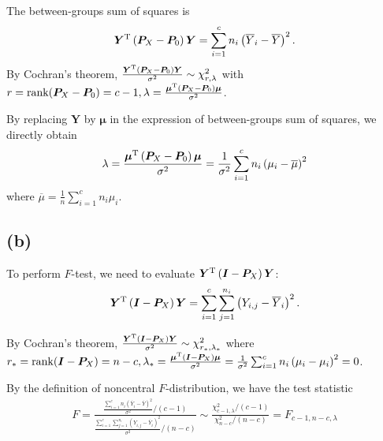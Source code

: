 \documentclass[a4paper]{article}
\begin{document}
The between-groups sum of squares is
\begin{align*}
\bm{Y}^{\rm T}\left(\bm{P}_{X} -\bm{P}_{0} \right)\bm{Y} = \sum_{i=1}^{c} n_{i}\left(\overline{Y}_{i} - \overline{Y}\right)^2.
\end{align*}
By Cochran's theorem, $\frac{\bm{Y}^{\rm T}\left(\bm{P}_{X} -\bm{P}_{0} \right)\bm{Y}}{\sigma^2} \sim \chi_{r, \lambda}^2$ with $r = \mathrm{rank}(\bm{P}_{X} -\bm{P}_{0}) = c-1, \lambda = \frac{\bm{\mu}^{\rm T}\left(\bm{P}_{X} -\bm{P}_{0} \right)\bm{\mu}}{\sigma^2}$.

By replacing $\bm{Y}$ by $\bm{\mu}$ in the expression of between-groups sum of squares, we directly obtain
\begin{align*}
\lambda = \frac{\bm{\mu}^{\rm T}\left(\bm{P}_{X} -\bm{P}_{0} \right)\bm{\mu}}{\sigma^2} = \frac{1}{\sigma^2} \sum_{i=1}^{c} n_{i}\left(\mu_{i} - \overline{\mu}\right)^2
\end{align*}
where $\overline{\mu} = \frac{1}{n} \sum_{i=1}^{c} n_{i} \mu_{i}$.

\subsection{(b)}
To perform $F$-test, we need to evaluate $\bm{Y}^{\rm T}\left(\bm{I} -\bm{P}_{X}\right)\bm{Y}$:
\begin{align*}
\bm{Y}^{\rm T}\left(\bm{I} -\bm{P}_{X}\right)\bm{Y} = \sum_{i=1}^{c} \sum_{j=1}^{n_{i}} \left(Y_{i,j} - \overline{Y}_{i} \right)^2.
\end{align*}


By Cochran's theorem, $\frac{\bm{Y}^{\rm T}\left(\bm{I} -\bm{P}_{X}\right)\bm{Y}}{\sigma^2} \sim \chi_{r_{*} , \lambda_{*}}^2$ where $r_{*} = \mathrm{rank}(\bm{I} -\bm{P}_{X}) = n-c, \lambda_{*} = \frac{\bm{\mu}^{\rm T}\left(\bm{I} -\bm{P}_{X} \right)\bm{\mu}}{\sigma^2} = \frac{1}{\sigma^2} \sum_{i=1}^{c} n_{i}\left(\mu_{i} - \mu_{i}\right)^2 = 0$.


By the definition of noncentral $F$-distribution, we have the test statistic
\begin{align*}
F = \frac{\frac{\sum_{i=1}^{c} n_{i}\left(\overline{Y}_{i} - \overline{Y}\right)^2}{\sigma^2}/(c-1)}{\frac{\sum_{i=1}^{c} \sum_{j=1}^{n_{i}} \left(Y_{i,j} - \overline{Y}_{i} \right)^2}{\sigma^2} / (n-c)} \sim \frac{\chi_{c-1, \lambda}^2 / (c-1)}{\chi_{n-c}^2 / (n-c)} = F_{c-1,n-c,\lambda}
\end{align*}
\end{document}
